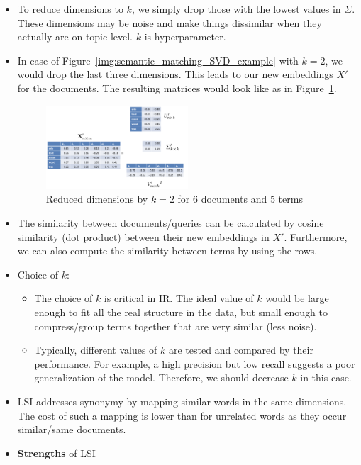 \begin{itemize}
	\item To reduce dimensions to $k$, we simply drop those with the lowest values in $\Sigma$. These dimensions may be noise and make things dissimilar when they actually are on topic level. $k$ is hyperparameter.
	\item In case of Figure~\ref{img:semantic_matching_SVD_example} with $k=2$, we would drop the last three dimensions. This leads to our new embeddings $X'$ for the documents. The resulting matrices would look like as in Figure~\ref{img:semantic_matching_SVD_example_2}.
	\begin{figure}[ht]
		\centering
		\includegraphics[width=0.5\textwidth]{figures/semantic_matching_SVD_example_2.png}
		\caption{Reduced dimensions by $k=2$ for 6 documents and 5 terms}
		\label{img:semantic_matching_SVD_example_2}
	\end{figure}
	\item The similarity between documents/queries can be calculated by cosine similarity (dot product) between their new embeddings in $X'$. Furthermore, we can also compute the similarity between terms by using the rows.
	\item Choice of $k$:
	\begin{itemize}
		\item The choice of $k$ is critical in IR. The ideal value of $k$ would be large enough to fit all the real structure in the data, but small enough to compress/group terms together that are very similar (less noise).
		\item Typically, different values of $k$ are tested and compared by their performance. For example, a high precision but low recall suggests a poor generalization of the model. Therefore, we should decrease $k$ in this case.
	\end{itemize}
	\item LSI addresses synonymy by mapping similar words in the same dimensions. The cost of such a mapping is lower than for unrelated words as they occur similar/same documents. 
	\item \textbf{Strengths} of LSI
	\begin{itemize}

\end{itemize}
\end{itemize}
